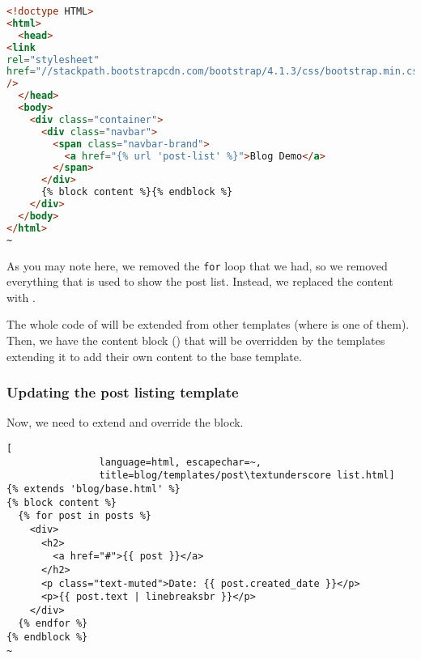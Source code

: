             \begin{lstlisting}[language=html, escapechar=~, title=blog/templates/base.html]
<!doctype HTML>
<html>
  <head>
<link
rel="stylesheet"
href="//stackpath.bootstrapcdn.com/bootstrap/4.1.3/css/bootstrap.min.css"
/>
  </head>
  <body>
    <div class="container">
      <div class="navbar">
        <span class="navbar-brand">
          <a href="{% url 'post-list' %}">Blog Demo</a>
        </span>
      </div>
      {% block content %}{% endblock %}
    </div>
  </body>
</html>
~
            \end{lstlisting}
            
            As you may note here, we removed the \texttt{for} loop that we had,
            so we removed everything that is used to show the post list. Instead,
            we replaced the content with .
            
            The whole code of  will be extended from other templates
            (where  is one of them). Then, we have
            the content block ()
            that will be overridden by the templates extending it to add their own content 
            to the base template.
            
        \subsubsection{Updating the post listing template}
            Now, we need to extend  and override the  block.
            
            \begin{lstlisting}[
                language=html, escapechar=~, 
                title=blog/templates/post\textunderscore list.html]
{% extends 'blog/base.html' %}
{% block content %}
  {% for post in posts %}
    <div>
      <h2>
        <a href="#">{{ post }}</a>
      </h2>
      <p class="text-muted">Date: {{ post.created_date }}</p>
      <p>{{ post.text | linebreaksbr }}</p>
    </div>
  {% endfor %}
{% endblock %}
~
            \end{lstlisting}
